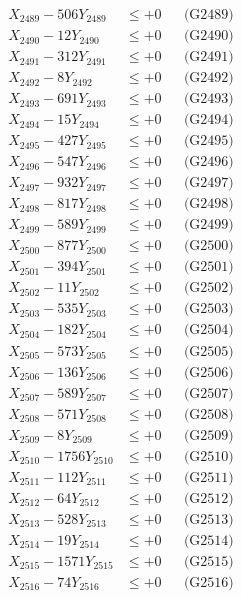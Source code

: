 \documentclass[a4paper,10pt]{article}
\begin{document}
{\begin{align}
X_{2489} - 506Y_{2489} &\leq +0 && \text{(G2489)} \\
X_{2490} - 12Y_{2490} &\leq +0 && \text{(G2490)} \\
\allowbreak
X_{2491} - 312Y_{2491} &\leq +0 && \text{(G2491)} \\
X_{2492} - 8Y_{2492} &\leq +0 && \text{(G2492)} \\
X_{2493} - 691Y_{2493} &\leq +0 && \text{(G2493)} \\
X_{2494} - 15Y_{2494} &\leq +0 && \text{(G2494)} \\
X_{2495} - 427Y_{2495} &\leq +0 && \text{(G2495)} \\
X_{2496} - 547Y_{2496} &\leq +0 && \text{(G2496)} \\
X_{2497} - 932Y_{2497} &\leq +0 && \text{(G2497)} \\
X_{2498} - 817Y_{2498} &\leq +0 && \text{(G2498)} \\
X_{2499} - 589Y_{2499} &\leq +0 && \text{(G2499)} \\
X_{2500} - 877Y_{2500} &\leq +0 && \text{(G2500)} \\
\allowbreak
X_{2501} - 394Y_{2501} &\leq +0 && \text{(G2501)} \\
X_{2502} - 11Y_{2502} &\leq +0 && \text{(G2502)} \\
X_{2503} - 535Y_{2503} &\leq +0 && \text{(G2503)} \\
X_{2504} - 182Y_{2504} &\leq +0 && \text{(G2504)} \\
X_{2505} - 573Y_{2505} &\leq +0 && \text{(G2505)} \\
X_{2506} - 136Y_{2506} &\leq +0 && \text{(G2506)} \\
X_{2507} - 589Y_{2507} &\leq +0 && \text{(G2507)} \\
X_{2508} - 571Y_{2508} &\leq +0 && \text{(G2508)} \\
X_{2509} - 8Y_{2509} &\leq +0 && \text{(G2509)} \\
X_{2510} - 1756Y_{2510} &\leq +0 && \text{(G2510)} \\
\allowbreak
X_{2511} - 112Y_{2511} &\leq +0 && \text{(G2511)} \\
X_{2512} - 64Y_{2512} &\leq +0 && \text{(G2512)} \\
X_{2513} - 528Y_{2513} &\leq +0 && \text{(G2513)} \\
X_{2514} - 19Y_{2514} &\leq +0 && \text{(G2514)} \\
X_{2515} - 1571Y_{2515} &\leq +0 && \text{(G2515)} \\
X_{2516} - 74Y_{2516} &\leq +0 && \text{(G2516)} \\

\end{align}}
\end{document}
